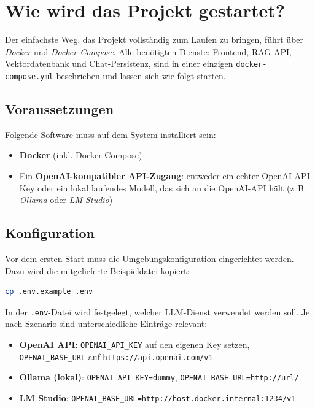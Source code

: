 \chapter{Wie wird das Projekt gestartet?}
\label{chap: anleitung}

Der einfachste Weg, das Projekt vollständig zum Laufen zu bringen, führt über
\emph{Docker} und \emph{Docker Compose}. Alle benötigten Dienste: Frontend,
RAG-API, Vektordatenbank und Chat-Persistenz, sind in einer einzigen
\texttt{docker-compose.yml} beschrieben und lassen sich wie folgt starten.

\section{Voraussetzungen}

Folgende Software muss auf dem System installiert sein:

\begin{itemize}
    \item \textbf{Docker} (inkl. Docker Compose)
    \item Ein \textbf{OpenAI-kompatibler API-Zugang}: entweder ein echter OpenAI API Key
    oder ein lokal laufendes Modell, das sich an die OpenAI-API hält
    (z.\,B. \emph{Ollama} oder \emph{LM Studio})
\end{itemize}

\section{Konfiguration}

Vor dem ersten Start muss die Umgebungskonfiguration eingerichtet werden.
Dazu wird die mitgelieferte Beispieldatei kopiert:

\begin{lstlisting}[language=bash, caption={Konfigurationsdatei anlegen}]
cp .env.example .env
\end{lstlisting}

In der \texttt{.env}-Datei wird festgelegt, welcher LLM-Dienst verwendet werden soll.
Je nach Szenario sind unterschiedliche Einträge relevant:

\begin{itemize}
    \item \textbf{OpenAI API}: \texttt{OPENAI\_API\_KEY} auf den eigenen Key setzen,
    \texttt{OPENAI\_BASE\_URL} auf \texttt{https://api.openai.com/v1}.
    \item \textbf{Ollama (lokal)}: \texttt{OPENAI\_API\_KEY=dummy},
    \texttt{OPENAI\_BASE\_URL=http://url/}.
    \item \textbf{LM Studio}: \texttt{OPENAI\_BASE\_URL=http://host.docker.internal:1234/v1}.
\end{itemize}

